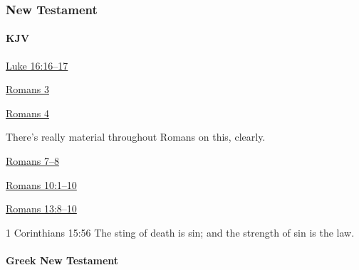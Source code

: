 	\subsubsection{New Testament} %
		\label{LAW-NT}
	
		\paragraph{KJV}
			\label{LAW-NT-KJV}
			
	
			
			\begin{compactdesc}
				\item[{\hyperref[LUKE-16-16]{Luke 16:16--17}}]
				\item[{\hyperref[ROMANS-3]{Romans 3}}]
				\item[{\hyperref[ROMANS-4]{Romans 4}}] \phantom{.}
					\begin{compactitem}
						\item There's really material throughout Romans on this, clearly.
					\end{compactitem}
				\item[{\hyperref[ROMANS-7]{Romans 7--8}}]
				\item[{\hyperref[ROMANS-10-1]{Romans 10:1--10}}]
				\item[{\hyperref[ROMANS-13-8]{Romans 13:8--10}}]
				\item[1 Corinthians 15:56] The sting of death is sin; and the strength of sin is the law.
			\end{compactdesc}
			
		\paragraph{Greek New Testament} %
			\label{LAW-GREEK}
		
			\subparagraph{\texorpdfstring{}{}}
				\label{ANOMOS-2}
			
